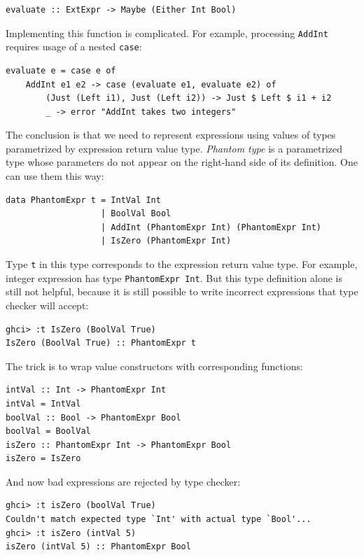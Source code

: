 \documentclass{tmr}
\newcommand{\italic}[1]{\textit{#1}}
\begin{document}
\begin{Verbatim}
evaluate :: ExtExpr -> Maybe (Either Int Bool)
\end{Verbatim}

Implementing this function is complicated. For example, processing \verb|AddInt| requires usage of a nested \verb|case|:

\begin{Verbatim}
evaluate e = case e of
    AddInt e1 e2 -> case (evaluate e1, evaluate e2) of
        (Just (Left i1), Just (Left i2)) -> Just $ Left $ i1 + i2
        _ -> error "AddInt takes two integers"
\end{Verbatim}

The conclusion is that we need to represent expressions using values of types parametrized by expression return value type. \italic{Phantom type} is a parametrized type whose parameters do not appear on the right-hand side of its definition. One can use them this way:

\begin{Verbatim}
data PhantomExpr t = IntVal Int
                   | BoolVal Bool
                   | AddInt (PhantomExpr Int) (PhantomExpr Int)
                   | IsZero (PhantomExpr Int)
\end{Verbatim}

Type \verb|t| in this type corresponds to the expression return value type. For example, integer expression has type \verb|PhantomExpr Int|. But this type definition alone is still not helpful, because it is still possible to write incorrect expressions that type checker will accept:

\begin{Verbatim}
ghci> :t IsZero (BoolVal True)
IsZero (BoolVal True) :: PhantomExpr t
\end{Verbatim}

The trick is to wrap value constructors with corresponding functions:

\begin{Verbatim}
intVal :: Int -> PhantomExpr Int
intVal = IntVal
boolVal :: Bool -> PhantomExpr Bool
boolVal = BoolVal
isZero :: PhantomExpr Int -> PhantomExpr Bool
isZero = IsZero
\end{Verbatim}

And now bad expressions are rejected by type checker:

\begin{Verbatim}
ghci> :t isZero (boolVal True)
Couldn't match expected type `Int' with actual type `Bool'...
ghci> :t isZero (intVal 5)
isZero (intVal 5) :: PhantomExpr Bool
\end{Verbatim}
\end{document}
